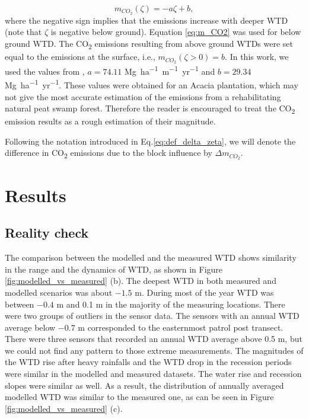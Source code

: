 \documentclass[bg, manuscript]{copernicus}
\begin{document}
\begin{equation} \label{eq:m_CO2}
    m_{CO_2}(\zeta) = -a  \zeta + b,
\end{equation}
where the negative sign implies that the emissions increase with deeper WTD (note that $\zeta$ is negative below ground).
Equation \eqref{eq:m_CO2} was used for below ground WTD.
The CO\textsubscript{2} emissions resulting from above ground WTDs were set equal to the emissions at the surface, i.e., $m_{CO_2}(\zeta > 0) = b$. 
In this work, we used the values from \cite{jauhiainenCarbonDioxideEmissions2012}, $a=74.11$ \unit{Mg ha^{-1} m^{-1} yr^{-1}} and  $b=29.34$ \unit{Mg ha^{-1} yr^{-1}}.
These values were obtained for an Acacia plantation, which may not give the most accurate estimation of the emissions from a rehabilitating natural peat swamp forest. 
Therefore the reader is encouraged to treat the CO\textsubscript{2} emission results as a rough estimation of their magnitude.

Following the notation introduced in Eq.\eqref{eq:def_delta_zeta}, we will denote the difference in CO\textsubscript{2} emissions due to the block influence by $\Delta m_{CO_2}$.



\section{Results}

\subsection{Reality check}
The comparison between the modelled and the measured WTD shows similarity in the range and  the dynamics of WTD, as shown in Figure \ref{fig:modelled_vs_measured} (b).
The deepest WTD in both measured and modelled scenarios was about $-1.5$ \unit{m}.
During most of the year WTD was between $-0.4$ \unit{m} and 0.1 \unit{m} in the majority of the measuring locations.
There were two groups of outliers in the sensor data.
The sensors with an annual WTD average below $-0.7$ \unit{m}  corresponded to the easternmost patrol post transect.
There were three sensors that recorded an annual WTD average above 0.5 \unit{m}, but we could not find any pattern to those extreme measurements.
The magnitudes of the WTD rise after heavy rainfalls and the WTD drop in the recession periods were similar in the modelled and measured datasets.
The water rise and recession slopes were similar as well.
As a result, the distribution of annually averaged modelled WTD was similar to the measured one, as can be seen in Figure \ref{fig:modelled_vs_measured} (c).
\end{document}

